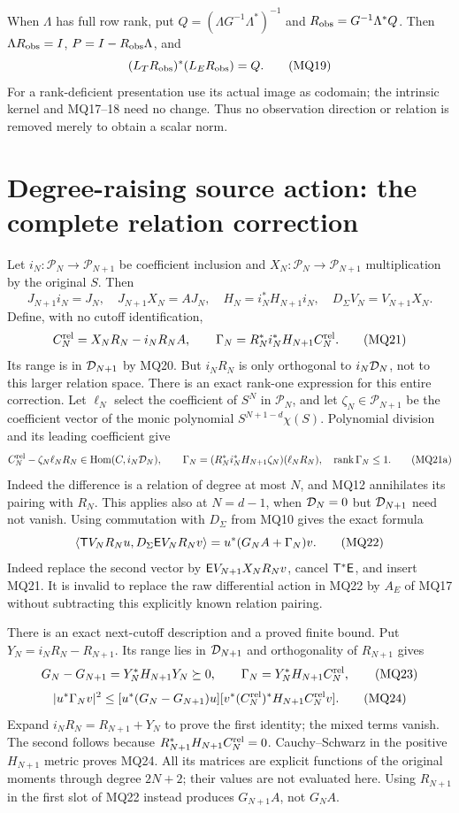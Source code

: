 When $\Lambda$ has full row rank, put
$Q=(\Lambda G^{-1}\Lambda^*)^{-1}$ and
$R_{\rm obs}=G^{-1}\Lambda^*Q$. Then
$\Lambda R_{\rm obs}=I$, $P=I-R_{\rm obs}\Lambda$, and
\[
 (L_TR_{\rm obs})^*(L_ER_{\rm obs})=Q.                      \tag{MQ19}
\]
For a rank-deficient presentation use its actual image as codomain;
the intrinsic kernel and MQ17--18 need no change. Thus no observation
direction or relation is removed merely to obtain a scalar norm.

\section{Degree-raising source action: the complete relation correction}
Let $i_N:\mathcal P_N\to\mathcal P_{N+1}$ be coefficient inclusion
and $X_N:\mathcal P_N\to\mathcal P_{N+1}$ multiplication by the
original $S$. Then
\[
 J_{N+1}i_N=J_N,\quad J_{N+1}X_N=AJ_N,\quad
 H_N=i_N^*H_{N+1}i_N,\quad D_\Sigma V_N=V_{N+1}X_N.         \tag{MQ20}
\]
Define, with no cutoff identification,
\[
 C_N^{\rm rel}=X_NR_N-i_NR_NA,\qquad
 \Gamma_N=R_N^*i_N^*H_{N+1}C_N^{\rm rel}.                  \tag{MQ21}
\]
Its range is in $\mathcal D_{N+1}$ by MQ20. But $i_NR_N$ is only
orthogonal to $i_N\mathcal D_N$, not to this larger relation space.
There is an exact rank-one expression for this entire correction.
Let $\ell_N$ select the coefficient of $S^N$ in $\mathcal P_N$,
and let $\zeta_N\in\mathcal P_{N+1}$ be the coefficient vector
of the monic polynomial $S^{N+1-d}\chi(S)$. Polynomial division
and its leading coefficient give
\[
 C_N^{\rm rel}-\zeta_N\ell_NR_N\in
       \operatorname{Hom}(C,i_N\mathcal D_N),\qquad
 \Gamma_N=(R_N^*i_N^*H_{N+1}\zeta_N)(\ell_NR_N),\quad
 \operatorname{rank}\Gamma_N\le1.                          \tag{MQ21a}
\]
Indeed the difference is a relation of degree at most $N$, and
MQ12 annihilates its pairing with $R_N$. This applies also at
$N=d-1$, when $\mathcal D_N=0$ but $\mathcal D_{N+1}$ need not vanish.
Using commutation with $D_\Sigma$ from MQ10 gives the exact formula
\[
 \langle\mathsf T V_NR_Nu,D_\Sigma\mathsf E V_NR_Nv\rangle
       =u^*(G_NA+\Gamma_N)v.                               \tag{MQ22}
\]
Indeed replace the second vector by $\mathsf E V_{N+1}X_NR_Nv$,
cancel $\mathsf T^*\mathsf E$, and insert MQ21. It is invalid to replace
the raw differential action in MQ22 by $A_E$ of MQ17 without
subtracting this explicitly known relation pairing.

There is an exact next-cutoff description and a proved finite bound.
Put $Y_N=i_NR_N-R_{N+1}$. Its range lies in $\mathcal D_{N+1}$ and
orthogonality of $R_{N+1}$ gives
\[
 G_N-G_{N+1}=Y_N^*H_{N+1}Y_N\succeq0,\qquad
 \Gamma_N=Y_N^*H_{N+1}C_N^{\rm rel},                       \tag{MQ23}
\]
\[
 |u^*\Gamma_Nv|^2\le
   [u^*(G_N-G_{N+1})u]
   [v^*(C_N^{\rm rel})^*H_{N+1}C_N^{\rm rel}v].             \tag{MQ24}
\]
Expand $i_NR_N=R_{N+1}+Y_N$ to prove the first identity;
the mixed terms vanish. The second follows because
$R_{N+1}^*H_{N+1}C_N^{\rm rel}=0$. Cauchy--Schwarz in the
positive $H_{N+1}$ metric proves MQ24. All its matrices are
explicit functions of the original moments through degree $2N+2$;
their values are not evaluated here. Using $R_{N+1}$ in the first
slot of MQ22 instead produces $G_{N+1}A$, not $G_NA$.


